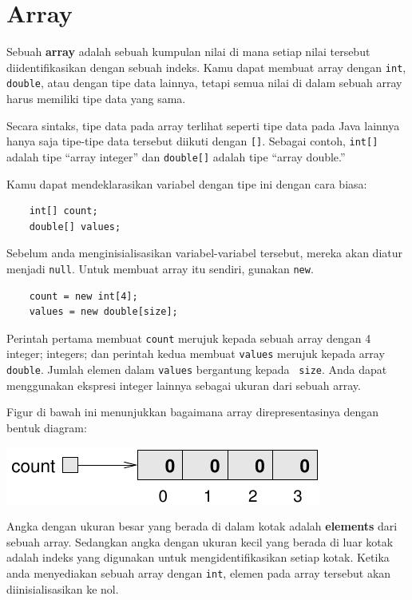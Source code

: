 \chapter{Array}

Sebuah {\bf array}
adalah sebuah kumpulan nilai di mana setiap nilai tersebut diidentifikasikan dengan sebuah indeks.
Kamu dapat membuat array dengan
{\tt int}, {\tt double}, atau dengan tipe data lainnya, 
tetapi semua nilai di dalam sebuah array harus memiliki tipe data yang sama.

Secara sintaks, tipe data pada array terlihat seperti tipe data pada Java lainnya hanya saja tipe-tipe data tersebut 
diikuti dengan {\tt []}.  Sebagai contoh, {\tt int[]} adalah tipe ``array
integer'' dan {\tt double[]} adalah tipe ``array double.''

Kamu dapat mendeklarasikan variabel dengan tipe ini dengan cara biasa:

\begin{lstlisting}
    int[] count;
    double[] values;
\end{lstlisting}
%
Sebelum anda menginisialisasikan variabel-variabel tersebut, mereka akan diatur menjadi {\tt null}.
Untuk membuat array itu sendiri, gunakan {\tt new}.

\begin{lstlisting}
    count = new int[4];
    values = new double[size];
\end{lstlisting}
%
Perintah pertama membuat {\tt count} merujuk kepada sebuah array dengan 4 integer;
integers; dan perintah kedua membuat {\tt values} merujuk kepada array {\tt
double}.  Jumlah elemen dalam {\tt values} bergantung kepada {\tt
size}.  Anda dapat menggunakan ekspresi integer lainnya sebagai ukuran dari sebuah array.


Figur di bawah ini menunjukkan bagaimana array direpresentasinya dengan bentuk diagram:


\includegraphics{array.pdf}


Angka dengan ukuran besar yang berada di dalam kotak adalah {\bf elements} dari sebuah array.  Sedangkan angka dengan ukuran kecil yang berada di luar kotak adalah indeks yang digunakan untuk mengidentifikasikan setiap kotak.  Ketika anda menyediakan sebuah array dengan
 {\tt int}, elemen pada array tersebut akan diinisialisasikan ke nol.


